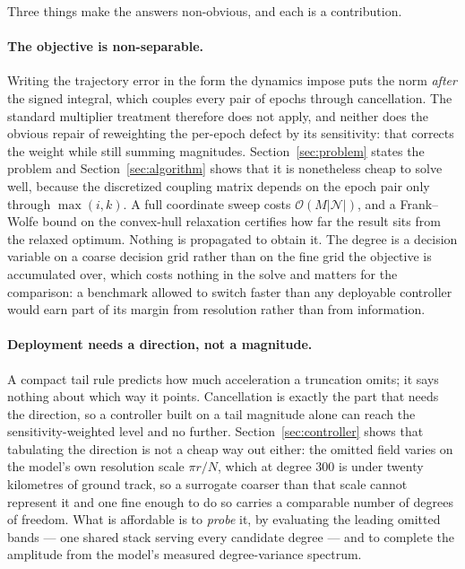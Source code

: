 Three things make the answers non-obvious, and each is a contribution.

\paragraph{The objective is non-separable.} Writing the trajectory error in the
form the dynamics impose puts the norm \emph{after} the signed integral, which
couples every pair of epochs through cancellation. The standard multiplier
treatment therefore does not apply, and neither does the obvious repair of
reweighting the per-epoch defect by its sensitivity: that corrects the weight
while still summing magnitudes. Section~\ref{sec:problem} states the problem
and Section~\ref{sec:algorithm} shows that it is nonetheless cheap to solve
well, because the discretized coupling matrix depends on the epoch pair only
through $\max(i,k)$. A full coordinate sweep costs
$\mathcal{O}(M\lvert\mathcal{N}\rvert)$, and a Frank--Wolfe bound on the
convex-hull relaxation \citep{frank1956algorithm,jaggi2013revisiting}
certifies how far the result sits from the relaxed optimum. Nothing is
propagated to obtain it. The degree is a decision variable on a coarse decision
grid rather than on the fine grid the objective is accumulated over, which
costs nothing in the solve and matters for the comparison: a benchmark allowed
to switch faster than any deployable controller would earn part of its margin
from resolution rather than from information.

\paragraph{Deployment needs a direction, not a magnitude.} A compact tail rule
predicts how much acceleration a truncation omits; it says nothing about which
way it points. Cancellation is exactly the part that needs the direction, so a
controller built on a tail magnitude alone can reach the
sensitivity-weighted level and no further. Section~\ref{sec:controller} shows
that tabulating the direction is not a cheap way out either: the omitted field
varies on the model's own resolution scale $\pi r/N$, which at degree 300 is
under twenty kilometres of ground track, so a surrogate coarser than that scale
cannot represent it and one fine enough to do so carries a comparable number of
degrees of freedom. What is affordable is to \emph{probe} it, by evaluating the
leading omitted bands --- one shared stack serving every candidate degree ---
and to complete the amplitude from the model's measured degree-variance
spectrum.

